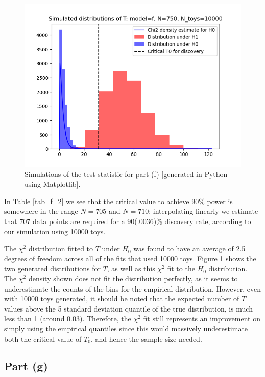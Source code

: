 \documentclass[12pt]{article}
\begin{document}
\begin{figure}[htbp]
  \includegraphics[scale=0.8]{T_distributions_f_750_10000.png}
  \caption{Simulations of the test statistic for part (f) [generated in Python using Matplotlib].}
  \label{part_f_plot}
\end{figure}

In Table \ref{tab_f_2} we see that the critical value to achieve 90\% power is somewhere in the range $N=705$ and $N=710$; interpolating linearly we estimate that 707 data points are required for a 90(.0036)\% discovery rate, according to our simulation using 10000 toys.

The $\chi^2$ distribution fitted to $T$ under $H_0$ was found to have an average of 2.5 degrees of freedom across all of the fits that used 10000 toys.
Figure \ref{part_f_plot} shows the two generated distributions for $T$, as well as this $\chi^2$ fit to the $H_0$ distribution.
The $\chi^2$ density shown does not fit the distribution perfectly, as it seems to underestimate the counts of the bins for the empirical distribution.
However, even with 10000 toys generated, it should be noted that the expected number of $T$ values above the 5 standard deviation quantile of the true distribution, is much less than 1 (around 0.03).
Therefore, the $\chi^2$ fit still represents an improvement on simply using the empirical quantiles since this would massively underestimate both the critical value of $T_0$, and hence the sample size needed.

\subsection*{Part (g)}
\end{document}
